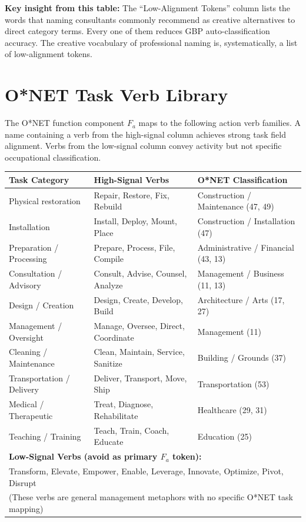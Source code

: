 \documentclass[12pt, openany]{book}
\theoremstyle{thmstyle}
\theoremstyle{defstyle}
\begin{document}
\textbf{Key insight from this table:} The ``Low-Alignment Tokens'' column lists the words that naming consultants commonly recommend as creative alternatives to direct category terms. Every one of them reduces GBP auto-classification accuracy. The creative vocabulary of professional naming is, systematically, a list of low-alignment tokens.

\section{O*NET Task Verb Library}

The O*NET function component $F_a$ maps to the following action verb families. A name containing a verb from the high-signal column achieves strong task field alignment. Verbs from the low-signal column convey activity but not specific occupational classification.

\begin{center}
\begin{tabular}{p{1.6in}p{1.4in}p{2.5in}}
\toprule
\textbf{Task Category} & \textbf{High-Signal Verbs} & \textbf{O*NET Classification} \\
\midrule
Physical restoration & Repair, Restore, Fix, Rebuild & Construction / Maintenance (47, 49) \\
Installation & Install, Deploy, Mount, Place & Construction / Installation (47) \\
Preparation / Processing & Prepare, Process, File, Compile & Administrative / Financial (43, 13) \\
Consultation / Advisory & Consult, Advise, Counsel, Analyze & Management / Business (11, 13) \\
Design / Creation & Design, Create, Develop, Build & Architecture / Arts (17, 27) \\
Management / Oversight & Manage, Oversee, Direct, Coordinate & Management (11) \\
Cleaning / Maintenance & Clean, Maintain, Service, Sanitize & Building / Grounds (37) \\
Transportation / Delivery & Deliver, Transport, Move, Ship & Transportation (53) \\
Medical / Therapeutic & Treat, Diagnose, Rehabilitate & Healthcare (29, 31) \\
Teaching / Training & Teach, Train, Coach, Educate & Education (25) \\
\midrule
\multicolumn{3}{l}{\textbf{Low-Signal Verbs (avoid as primary $F_a$ token):}} \\
\multicolumn{3}{l}{Transform, Elevate, Empower, Enable, Leverage, Innovate, Optimize, Pivot, Disrupt} \\
\multicolumn{3}{l}{(These verbs are general management metaphors with no specific O*NET task mapping)} \\
\bottomrule
\end{tabular}
\end{center}
\end{document}

